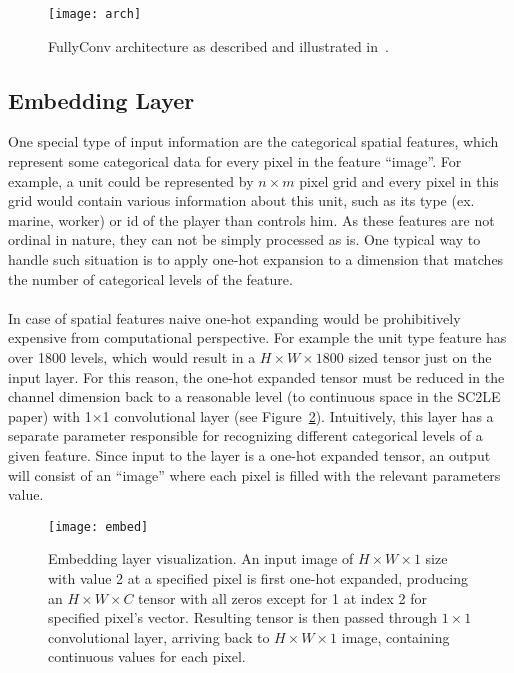 \begin{figure}[ht]
\begin{center}
\texttt{[image: arch]}
\caption{FullyConv architecture as described and illustrated in~\cite{Vinyals2017}.}
\label{fig:arch}
\end{center}
\end{figure}

\subsection{Embedding Layer}

One special type of input information are the categorical spatial features, which represent some categorical data for every pixel in the feature ``image''. For example, a unit could be represented by $n \times m$ pixel grid and every pixel in this grid would contain various information about this unit, such as its type (ex. marine, worker) or id of the player than controls him. As these features are not ordinal in nature, they can not be simply processed as is. One typical way to handle such situation is to apply one-hot expansion to a dimension that matches the number of categorical levels of the feature. 
\\\\
In case of spatial features naive one-hot expanding would be prohibitively expensive from computational perspective. For example the unit type feature has over 1800 levels, which would result in a $H \times W \times 1800$ sized tensor just on the input layer. For this reason, the one-hot expanded tensor must be reduced in the channel dimension back to a reasonable level (to continuous space in the SC2LE paper) with 1$\times$1 convolutional layer (see Figure~\ref{fig:embed}). Intuitively, this layer has a separate parameter responsible for recognizing different categorical levels of a given feature. Since input to the layer is a one-hot expanded tensor, an output will consist of an “image” where each pixel is filled with the relevant parameters value.

\begin{figure}[ht]
\begin{center}
\texttt{[image: embed]}
\caption{Embedding layer visualization. An input image of $H \times W \times 1$ size with value 2 at a specified pixel is first one-hot expanded, producing an $H \times W \times C$ tensor with all zeros except for 1 at index 2 for specified pixel’s vector. Resulting tensor is then passed through $1 \times 1$ convolutional layer, arriving back to $H \times W \times 1$ image, containing continuous values for each pixel.}
\label{fig:embed}
\end{center}
\end{figure}

